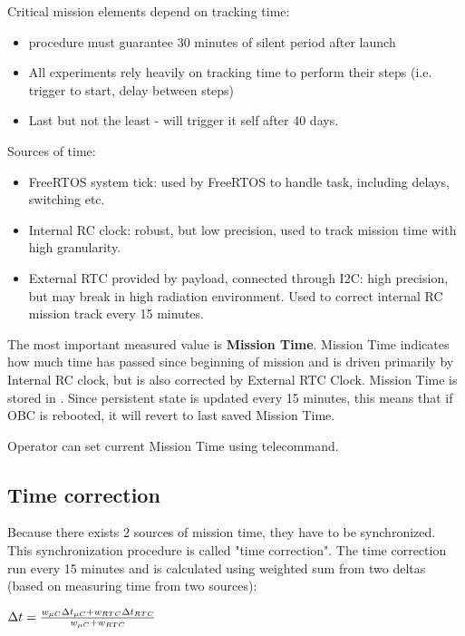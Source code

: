 
Critical mission elements depend on tracking time:
\begin{itemize}
	\item {} procedure must guarantee 30 minutes of silent period after launch
	\item All experiments rely heavily on tracking time to perform their steps (i.e. trigger to start, delay between steps)
	\item Last but not the least -  will trigger it self after 40 days.
\end{itemize}

Sources of time:
\begin{itemize}
	\item FreeRTOS system tick:  used by FreeRTOS to handle task, including delays, switching etc.
	\item Internal RC clock: robust, but low precision, used to track mission time with high granularity.
	\item External RTC provided by payload, connected through I2C: high precision, but may break in high radiation environment. Used to correct internal RC mission track every 15 minutes.
\end{itemize}

The most important measured value is \textbf{Mission Time}. Mission Time indicates how much time has passed since beginning of mission and is driven primarily by Internal RC clock, but is also corrected by External RTC Clock. Mission Time is stored in . Since persistent state is updated every 15 minutes, this means that if OBC is rebooted, it will revert to last saved Mission Time.

Operator can set current Mission Time using  telecommand.

\subsection{Time correction}\label{obc:proc:time-correction}

Because there exists 2 sources of mission time, they have to be synchronized. This synchronization procedure is called "time correction". The time correction run every 15 minutes and is calculated using weighted sum from two deltas (based on measuring time from two sources):

$\Delta t = \frac{w_{\mu C} \Delta t_{\mu C} + w_{RTC} \Delta t_{RTC}}{w_{\mu C} + w_{RTC}}$

